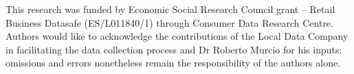 This research was funded by Economic Social Research Council grant – Retail Business Datasafe (ES/L011840/1) through Consumer Data Research Centre.
Authors would like to acknowledge the contributions of the Local Data Company in facilitating the data collection process and Dr Roberto Murcio for his inputs: omissions and errors nonetheless remain the responsibility of the authors alone.
